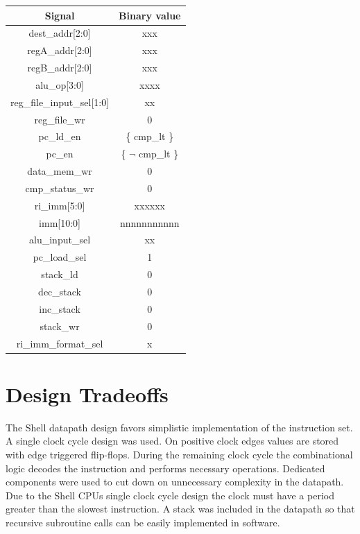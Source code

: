 \documentclass{article}
\begin{document}
\begin{par}
	\begin{center}
		\begin{tabular}{|c|c|}
			\hline 
			\textbf{Signal} & \textbf{Binary value} \\ 
			\hline 
			dest\_addr[2:0] & xxx \\ 
			\hline 
			regA\_addr[2:0] & xxx \\ 
			\hline 
			regB\_addr[2:0] & xxx \\ 
			\hline 
			alu\_op[3:0] & xxxx \\ 
			\hline 
			reg\_file\_input\_sel[1:0] & xx \\ 
			\hline 
			reg\_file\_wr & 0 \\ 
			\hline 
			pc\_ld\_en & \{ cmp\_lt \} \\ 
			\hline 
			pc\_en & \{ $ \lnot $ cmp\_lt \} \\ 
			\hline 
			data\_mem\_wr & 0 \\ 
			\hline 
			cmp\_status\_wr & 0 \\ 
			\hline 
			ri\_imm[5:0] & xxxxxx \\ 
			\hline 
			imm[10:0] & nnnnnnnnnnn \\ 
			\hline 
			alu\_input\_sel & xx \\ 
			\hline 
			pc\_load\_sel & 1 \\ 
			\hline 
			stack\_ld & 0 \\ 
			\hline 
			dec\_stack & 0 \\ 
			\hline 
			inc\_stack & 0 \\ 
			\hline 
			stack\_wr & 0 \\ 
			\hline 
			ri\_imm\_format\_sel & x \\ 
			\hline 
		\end{tabular} 
	\end{center}

\end{par}

\newpage

\section{Design Tradeoffs}
\label{destrad}
\begin{par}
	The Shell datapath design favors simplistic implementation of the instruction set. A single clock cycle design was used. On positive clock edges values are stored with edge triggered flip-flops. During the remaining clock cycle the combinational logic decodes the instruction and performs necessary operations. Dedicated components were used to cut down on unnecessary complexity in the datapath. Due to the Shell CPUs single clock cycle design the clock must have a period greater than the slowest instruction. A stack was included in the datapath so that recursive subroutine calls can be easily implemented in software. 
\end{par}
\end{document}
